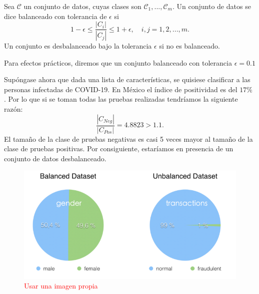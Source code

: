     \begin{definition}
    \label{balanced}
        Sea $\mathcal C$ un conjunto de datos, cuyas clases son $\mathcal C_1, ..., \mathcal C_m$. Un conjunto de datos se dice balanceado con tolerancia de $\epsilon$ si 
        \begin{equation}
            1-\epsilon \leq \frac{|C_i|}{|C_j|} \leq 1 + \epsilon, \quad i,j = 1,2, ..., m.
        \end{equation}
        Un conjunto es desbalanceado bajo la tolerancia $\epsilon$ si no es balanceado.
    \end{definition}
    Para efectos prácticos, diremos que un conjunto balanceado con tolerancia $\epsilon = 0.1$
    \begin{example}
        Supóngase ahora que dada una lista de características, se quisiese clasificar a las personas infectadas de COVID-19. En México el índice de positividad es del $17\%$ \cite{}. Por lo que si se toman todas las pruebas realizadas tendríamos la siguiente razón:
        \begin{equation}
            \frac{|C_{Neg}|}{|C_{Pos}|} = 4.8823 > 1.1.
        \end{equation}
        El tamaño de la clase de pruebas negativas es casi 5 veces mayor al tamaño de la clase de pruebas positivas. Por consiguiente, estaríamos en presencia de un conjunto de datos desbalanceado.
    \end{example}
    \begin{figure}[H]
        \centering
        \includegraphics[width=6in]{../cap1_preliminares/src/unbalanced.png}
        \caption{\textcolor{red}{Usar una imagen propia}}
    \end{figure}
